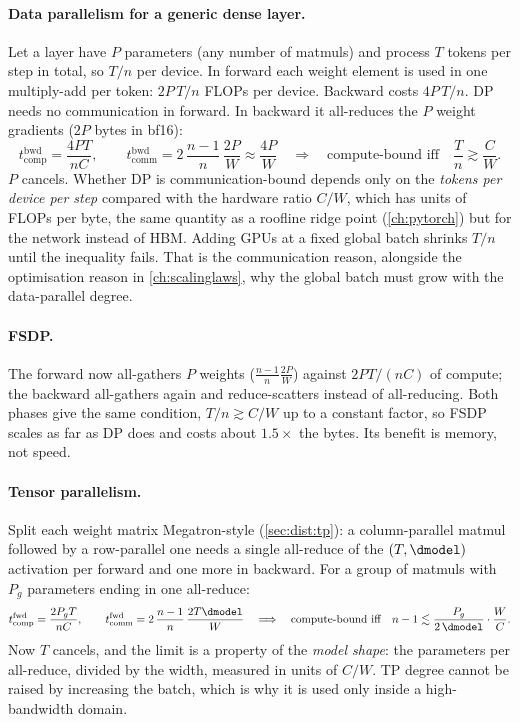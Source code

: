 \paragraph{Data parallelism for a generic dense layer.} Let a layer have $P$ parameters (any
number of matmuls) and process $T$ tokens per step in total, so $T/n$ per device. In forward each
weight element is used in one multiply-add per token: $2P\,T/n$ FLOPs per device. Backward costs
$4P\,T/n$. DP needs no communication in forward. In backward it all-reduces the $P$ weight
gradients ($2P$ bytes in bf16):
\[
  t_\text{comp}^\text{bwd} = \frac{4PT}{nC},\qquad
  t_\text{comm}^\text{bwd} = 2\,\frac{n-1}{n}\,\frac{2P}{W}\approx\frac{4P}{W}
  \quad\Longrightarrow\quad
  \text{compute-bound iff}\quad \frac{T}{n} \gtrsim \frac{C}{W}.
\]
$P$ cancels. Whether DP is communication-bound depends only on the \emph{tokens per device per
step} compared with the hardware ratio $C/W$, which has units of FLOPs per byte, the same
quantity as a roofline ridge point (\cref{ch:pytorch}) but for the network instead of HBM. Adding GPUs at
a fixed global batch shrinks $T/n$ until the inequality fails. That is the communication
reason, alongside the optimisation reason in \cref{ch:scalinglaws}, why the global batch must grow
with the data-parallel degree.

\paragraph{FSDP.} The forward now all-gathers $P$ weights ($\frac{n-1}{n}\frac{2P}{W}$) against
$2PT/(nC)$ of compute; the backward all-gathers again and reduce-scatters instead of all-reducing.
Both phases give the same condition, $T/n \gtrsim C/W$ up to a constant factor, so FSDP scales as far
as DP does and costs about $1.5\times$ the bytes. Its benefit is memory, not speed.

\paragraph{Tensor parallelism.} Split each weight matrix Megatron-style
(\cref{sec:dist:tp}): a column-parallel matmul followed by a row-parallel one needs a single
all-reduce of the $(T, \dmodel)$ activation per forward and one more in backward. For a group of
matmuls with $P_g$ parameters ending in one all-reduce:
\[
  t_\text{comp}^\text{fwd} = \frac{2P_gT}{nC},\qquad
  t_\text{comm}^\text{fwd} = 2\,\frac{n-1}{n}\,\frac{2T\dmodel}{W}
  \quad\Longrightarrow\quad
  \text{compute-bound iff}\quad n - 1 \lesssim \frac{P_g}{2\,\dmodel}\cdot\frac{W}{C}.
\]
Now $T$ cancels, and the limit is a property of the \emph{model shape}: the parameters per
all-reduce, divided by the width, measured in units of $C/W$. TP degree cannot be raised by
increasing the batch, which is why it is used only inside a high-bandwidth domain.

